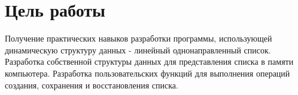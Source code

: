 \section*{Цель работы}

Получение практических навыков разработки программы,
использующей динамическую структуру данных - линейный
однонаправленный список.
Разработка собственной структуры данных для
представления списка в памяти компьютера.
Разработка пользовательских
функций для выполнения операций создания,
сохранения и восстановления
списка.